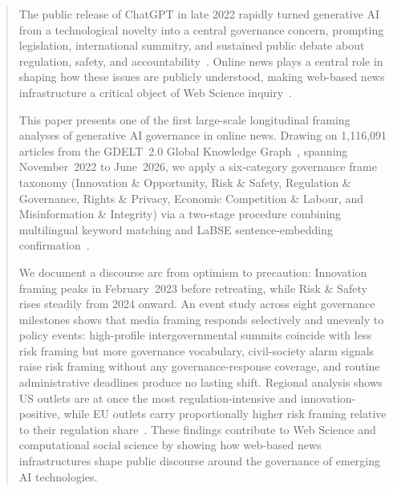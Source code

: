\documentclass[sigconf]{acmart}
\begin{document}


\begin{abstract}
The public release of ChatGPT in late 2022 rapidly turned generative AI from a technological novelty into a central governance concern, prompting legislation, international summitry, and sustained public debate about regulation, safety, and accountability~\cite{cheung_generative_2025,taeihagh_governance_2025}.
Online news plays a central role in shaping how these issues are publicly understood, making web-based news infrastructure a critical object of Web Science inquiry~\cite{lazer_computational_2009}.

This paper presents one of the first large-scale longitudinal framing analyses of generative AI governance in online news.
Drawing on 1,116,091 articles from the GDELT~2.0 Global Knowledge Graph~\cite{kalev_gdelt_2013}, spanning November~2022 to June~2026, we apply a six-category governance frame taxonomy (Innovation \& Opportunity, Risk \& Safety, Regulation \& Governance, Rights \& Privacy, Economic Competition \& Labour, and Misinformation \& Integrity) via a two-stage procedure combining multilingual keyword matching and LaBSE sentence-embedding confirmation~\cite{kwak_frameaxis_2021,feng_language-agnostic_2022}.

We document a discourse arc from optimism to precaution: Innovation framing peaks in February~2023 before retreating, while Risk \& Safety rises steadily from 2024 onward.
An event study across eight governance milestones shows that media framing responds selectively and unevenly to policy events: high-profile intergovernmental summits coincide with less risk framing but more governance vocabulary, civil-society alarm signals raise risk framing without any governance-response coverage, and routine administrative deadlines produce no lasting shift.
Regional analysis shows US outlets are at once the most regulation-intensive and innovation-positive, while EU outlets carry proportionally higher risk framing relative to their regulation share~\cite{nguyen_generative_2026}.
These findings contribute to Web Science and computational social science by showing how web-based news infrastructures shape public discourse around the governance of emerging AI technologies.
\end{abstract}
\end{document}
